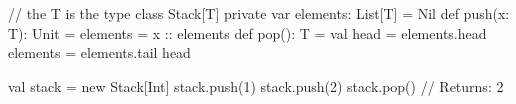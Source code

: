 // the T is the type
class Stack[T] {
  private var elements: List[T] = Nil
  def push(x: T): Unit = elements = x :: elements
  def pop(): T = {
    val head = elements.head
    elements = elements.tail
    head
  }
}

val stack = new Stack[Int]
stack.push(1)
stack.push(2)
stack.pop() // Returns: 2